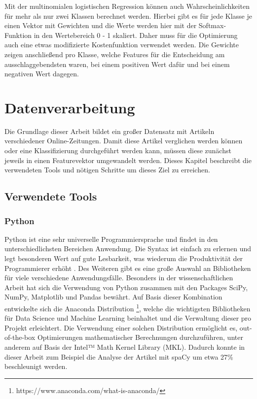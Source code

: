 Mit der multinomialen logistischen Regression können auch Wahrscheinlichkeiten für mehr als nur zwei Klassen berechnet werden. Hierbei gibt es für jede Klasse je einen Vektor mit Gewichten und die Werte werden hier mit der Softmax-Funktion in den Wertebereich 0 - 1 skaliert. Daher muss für die Optimierung auch eine etwas modifizierte Kostenfunktion verwendet werden. Die Gewichte zeigen anschließend pro Klasse, welche Features für die Entscheidung am ausschlaggebendsten waren, bei einem positiven Wert dafür und bei einem negativen Wert dagegen.


\chapter{Datenverarbeitung}
Die Grundlage dieser Arbeit bildet ein großer Datensatz mit Artikeln verschiedener Online-Zeitungen. Damit diese Artikel verglichen werden können oder eine Klassifizierung durchgeführt werden kann, müssen diese zunächst jeweils in einen Featurevektor umgewandelt werden. Dieses Kapitel beschreibt die verwendeten Tools und nötigen Schritte um dieses Ziel zu erreichen.

\section{Verwendete Tools}

\subsection{Python}\label{python}
Python ist eine sehr universelle Programmiersprache und findet in den unterschiedlichsten Bereichen Anwendung. Die Syntax ist einfach zu erlernen und legt besonderen Wert auf gute Lesbarkeit, was wiederum die Produktivität der Programmierer erhöht \cite{pythonSummary}. Des Weiteren gibt es eine große Auswahl an Bibliotheken für viele verschiedene Anwendungsfälle. Besonders in der wissenschaftlichen Arbeit hat sich die Verwendung von Python zusammen mit den Packages SciPy, NumPy, Matplotlib und Pandas bewährt. Auf Basis dieser Kombination entwickelte sich die Anaconda Distribution \footnote{https://www.anaconda.com/what-is-anaconda/}, welche die wichtigsten Bibliotheken für Data Science und Machine Learning beinhaltet und die Verwaltung dieser pro Projekt erleichtert. Die Verwendung einer solchen Distribution ermöglicht es, out-of-the-box Optimierungen mathematischer Berechnungen durchzuführen, unter anderem auf Basis der Intel™ Math Kernel Library (MKL). Dadurch konnte in dieser Arbeit zum Beispiel die Analyse der Artikel mit spaCy um etwa 27\% beschleunigt werden.

